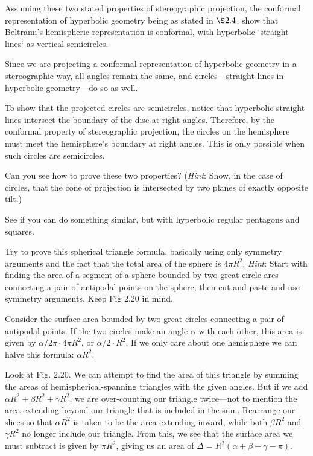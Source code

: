\documentclass[../road-to-reality]{subfiles}
\begin{document}
\begin{questions}
\question Assuming these two stated properties of stereographic projection, the conformal representation of hyperbolic geometry being as stated in $\S2.4$, show that Beltrami's hemispheric representation is conformal, with hyperbolic `straight lines` as vertical semicircles.

\begin{solution}
	Since we are projecting a conformal representation of hyperbolic geometry in a stereographic way, all angles remain the same, and circles---straight lines in hyperbolic geometry---do so as well.
	
	To show that the projected circles are semicircles, notice that hyperbolic straight lines intersect the boundary of the disc at right angles. Therefore, by the conformal property of stereographic projection, the circles on the hemisphere must meet the hemisphere's boundary at right angles. This is only possible when such circles are semicircles.
\end{solution}

\question Can you see how to prove these two properties? (\textit{Hint}: Show, in the case of circles, that the cone of projection is intersected by two planes of exactly opposite tilt.)

\question See if you can do something similar, but with hyperbolic regular pentagons and squares.

\question Try to prove this spherical triangle formula, basically using only symmetry arguments and the fact that the total area of the sphere is $4\pi{R^2}$. \textit{Hint}: Start with finding the area of a segment of a sphere bounded by two great circle arcs connecting a pair of antipodal points on the sphere; then cut and paste and use symmetry arguments. Keep Fig 2.20 in mind.

\begin{solution}
	Consider the surface area bounded by two great circles connecting a pair of antipodal points. If the two circles make an angle $\alpha$ with each other, this area is given by $\alpha/2\pi \cdot 4\pi{R^2}$, or $\alpha/2 \cdot R^2$. If we only care about one hemisphere we can halve this formula: $\alpha{R^2}$.

	Look at Fig. 2.20. We can attempt to find the area of this triangle by summing the areas of hemispherical-spanning triangles with the given angles. But if we add $\alpha{R^2} + \beta{R^2} + \gamma{R^2}$, we are over-counting our triangle twice---not to mention the area extending beyond our triangle that is included in the sum. Rearrange our slices so that $\alpha{R^2}$ is taken to be the area extending inward, while both $\beta{R^2}$ and $\gamma{R^2}$ no longer include our triangle. From this, we see that the surface area we must subtract is given by $\pi{R^2}$, giving us an area of $\Delta = R^2(\alpha + \beta + \gamma - \pi)$.
\end{solution}

\end{questions}
\end{document}
